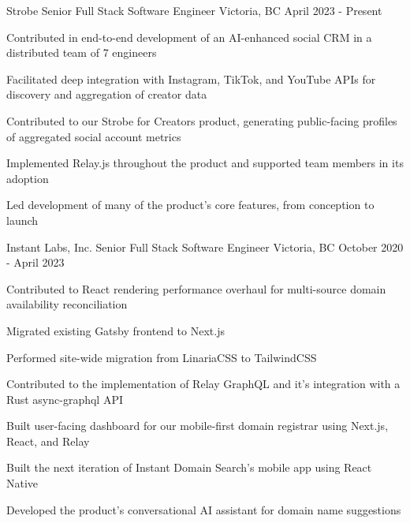 


\begin{cventries}


\cventry
{Strobe} %
{Senior Full Stack Software Engineer} %
{Victoria, BC} %
{April 2023 - Present} %
{ %
\begin{cvitems}
\item {Contributed in end-to-end development of an AI-enhanced social CRM in a distributed team of 7 engineers}
\item {Facilitated deep integration with Instagram, TikTok, and YouTube APIs for discovery and aggregation of creator data}
\item {Contributed to our Strobe for Creators product, generating public-facing profiles of aggregated social account metrics}
\item {Implemented Relay.js throughout the product and supported team members in its adoption}
\item {Led development of many of the product's core features, from conception to launch}
\end{cvitems}
}


\cventry
{Instant Labs, Inc.} %
{Senior Full Stack Software Engineer} %
{Victoria, BC} %
{October 2020 - April 2023} %
{ %
\begin{cvitems}
\item {Contributed to React rendering performance overhaul for multi-source domain availability reconciliation}
\item {Migrated existing Gatsby frontend to Next.js}
\item {Performed site-wide migration from LinariaCSS to TailwindCSS}
\item {Contributed to the implementation of Relay GraphQL and it's integration with a Rust async-graphql API}
\item {Built user-facing dashboard for our mobile-first domain registrar using Next.js, React, and Relay}
\item {Built the next iteration of Instant Domain Search's mobile app using React Native}
\item {Developed the product's conversational AI assistant for domain name suggestions}
\end{cvitems}
}


\end{cventries}
